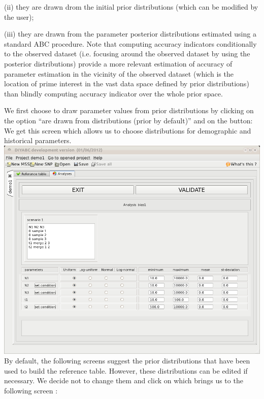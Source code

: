 (ii) they are drawn drom the initial prior distributions (which can
be modified by the user);

(iii) they are drawn from the parameter posterior distributions estimated
using a standard ABC procedure. Note that computing accuracy indicators
conditionally to the observed dataset (i.e. focusing around the observed
dataset by using the posterior distributions) provide a more relevant
estimation of accuracy of parameter estimation in the vicinity of
the observed dataset (which is the location of prime interest in the
vast data space defined by prior distributions) than blindly computing
accuracy indicator over the whole prior space.

We first choose to draw parameter values from prior distributions
by clicking on the option ``are drawn from distributions (prior by
default)'' and on the  button:\\


We get this screen which allows us to choose distributions for demographic
and historical parameters. \\


\includegraphics[scale=0.35]{gui_pictures/Capture-DIYABC-46} \\


By default, the following screens suggest the prior distributions
that have been used to build the reference table. However, these distributions
can be edited if necessary. We decide not to change them and click
on  which brings us to the following screen
:\\


